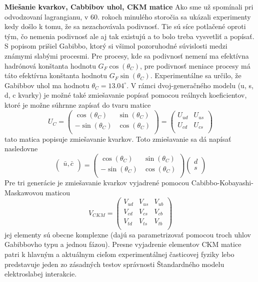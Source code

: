 \documentclass[../../main.tex]{subfiles}
\begin{document}
\textbf{Miešanie kvarkov, Cabbibov uhol, CKM matice}
Ako sme už spomínali pri odvodzovaní lagrangianu, v 60. rokoch minulého storočia sa ukázali experimenty kedy došlo k tomu, že sa nezachovávala podivnosť. Tie sú síce potlačené oproti tým, čo nemenia podivnosť ale aj tak existujú a to bolo treba vysvetliť a popísať. S popisom prišiel Gabibbo, ktorý si všimol pozoruhodné súvislosti medzi známymi slabými procesmi. Pre procesy, kde sa podivnosť nemení ma efektívna hadrónová konštanta hodnotu $G_F\cos(\theta_C)$, pre podivnosť meniace procesy má táto efektívna konštanta hodnotu $G_F\sin(\theta_C)$. Experimentálne sa určilo, že Gabibbov uhol ma hodnotu $\theta_C=13.04^{\circ}$. V rámci dvoj-generačného modelu (u, s, d, c kvarky) je možné také zmiešavanie popísať pomocou reálnych koeficientov, ktoré je možne súhrnne zapísať do tvaru matice
\[ U_C=
\begin{pmatrix}
    \cos(\theta_C) & \sin(\theta_C) \\
    -\sin(\theta_C) & \cos(\theta_C) \\
\end{pmatrix}=
\begin{pmatrix}
    U_{ud} & U_{us} \\
    U_{cd} & U_{cs} \\
\end{pmatrix}
\]
tato matica popisuje zmiešavanie kvarkov. Toto zmiešavanie sa dá napísať nasledovne 
\[
\begin{pmatrix}
    \bar{u},\bar{c} \\
\end{pmatrix}=
\begin{pmatrix}
    \cos(\theta_C) & \sin(\theta_C) \\
    -\sin(\theta_C) & \cos(\theta_C) \\
\end{pmatrix}
\begin{pmatrix}
    d \\
    s \\
\end{pmatrix}
\]
Pre tri generácie je zmiešavanie kvarkov vyjadrené pomocou Cabibbo-Kobayashi-Maskawovou maticou
\[ V_{CKM}=
\begin{pmatrix}
    V_{ud} & V_{us} & V_{ub} \\
    V_{cd} & V_{cs} & V_{cb} \\
    V_{td} & V_{ts} & V_{tb} \\
\end{pmatrix}
\]
jej elementy sú obecne komplexne (dajú sa parametrizovať pomocou troch uhlov Gabibbovho typu a jednou fázou). Presne vyjadrenie elementov CKM matice patri k hlavným a aktuálnym cieľom experimentálnej časticovej fyziky lebo predstavuje jeden zo zásadných testov správnosti Štandardného modelu elektroslabej interakcie.
\end{document}
